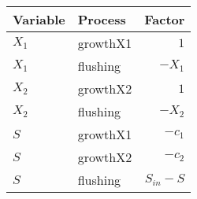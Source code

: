   \begin{tabular}{llr}\hline
    \textbf{Variable} & \textbf{Process} & \textbf{Factor} \\ \hline
    $X_1$ & growthX1 & $1$ \\
    $X_1$ & flushing & $-X_1$ \\
    $X_2$ & growthX2 & $1$ \\
    $X_2$ & flushing & $-X_2$ \\
    $S$ & growthX1 & $-c_1$ \\
    $S$ & growthX2 & $-c_2$ \\
    $S$ & flushing & $S_{in} - S$ \\ \hline
  \end{tabular}

